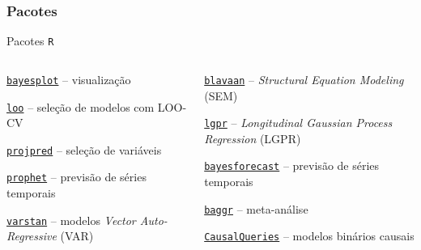 \subsubsection{Pacotes}
\begin{frame}{Pacotes \texttt{R}}
    \begin{columns}
        \begin{column}{0.5\textwidth}
            \begin{vfilleditems}
                \item \href{https://mc-stan.org/bayesplot/}{\texttt{bayesplot}} -- visualização
                \item \href{http://mc-stan.org/loo/}{\texttt{loo}} -- seleção de modelos com LOO-CV
                \item \href{https://mc-stan.org/projpred/}{\texttt{projpred}} -- seleção de variáveis
                \item \href{https://facebook.github.io/prophet/}{\texttt{prophet}} -- previsão de séries temporais
                \item \href{https://github.com/asael697/varstan}{\texttt{varstan}} -- modelos \textit{Vector Auto-Regressive} (VAR)
            \end{vfilleditems}
        \end{column}
        \begin{column}{0.5\textwidth}
            \begin{vfilleditems}
                \item \href{https://github.com/ecmerkle/blavaan}{\texttt{blavaan}} -- \textit{Structural Equation Modeling} (SEM)
                \item \href{https://github.com/jtimonen/lgpr/}{\texttt{lgpr}} -- \textit{Longitudinal Gaussian Process Regression} (LGPR)
                \item \href{https://github.com/asael697/bayesforecast}{\texttt{bayesforecast}} -- previsão de séries temporais
                \item \href{https://github.com/wwiecek/baggr}{\texttt{baggr}} -- meta-análise
                \item \href{https://github.com/macartan/CausalQueries}{\texttt{CausalQueries}} -- modelos binários causais
            \end{vfilleditems}
        \end{column}
    \end{columns}
\end{frame}

